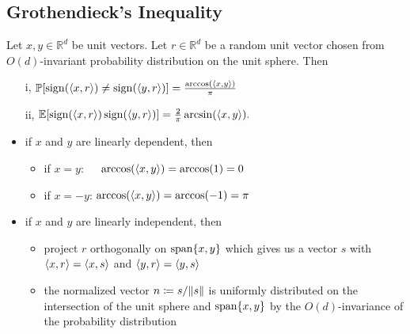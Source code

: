 \subsection{Grothendieck's Inequality}
	\frame{\tableofcontents[currentsubsection]}
	\begin{frame}
		\begin{lemma}\label{lem:G_id}
			Let $x,y\in\mathbb{R}^d$ be unit vectors. Let $r\in\mathbb{R}^d$ be a random unit vector chosen from $O(d)$-invariant probability distribution on the unit sphere. Then
			\begin{enumerate}
				\item[i,] $\mathbb{P}[\operatorname{sign}(\langle{x},{r}\rangle)\neq\operatorname{sign}(\langle{y},{r}\rangle)]=\frac{\arccos(\langle{x},{y}\rangle)}{\pi}$
				\item[ii,] $\mathbb{E}[\operatorname{sign}(\langle{x},{r}\rangle)\operatorname{sign}(\langle{y},{r}\rangle)]=\frac{2}{\pi}\arcsin(\langle{x},{y}\rangle).$
			\end{enumerate}
		\end{lemma}
		\begin{pbmr}
			\begin{itemize}
				\item<1-> if $x$ and $y$ are linearly dependent, then
					\begin{itemize}
						\item<2-> if $x=y$:~~\, $\arccos(\langle{x},{y}\rangle)=\arccos(1) = 0$
						\item<3-> if $x=-y$: $\arccos(\langle{x},{y}\rangle)=\arccos(-1) = \pi$
					\end{itemize}
				\item<4-> if $x$ and $y$ are linearly independent, then 
					\begin{itemize}
						\item<5-> project $r$ orthogonally on $\operatorname{span}\{x,y\}$ which gives us a vector $s$ with $\langle{x},{r}\rangle = \langle{x},{s}\rangle$ and $\langle{y},{r}\rangle = \langle{y},{s}\rangle$
						\item<6-> the normalized vector $n\coloneqq s/ \Vert {s} \Vert$ is uniformly distributed on the intersection of the unit sphere and $\operatorname{span}\{x,y\}$ by the $O(d)$-invariance of the probability distribution
					\end{itemize}
			\end{itemize}
		\end{pbmr}
	\end{frame}
	
